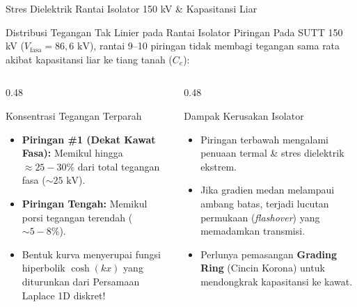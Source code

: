 \documentclass[aspectratio=169,10pt]{beamer}
\begin{document}
\begin{frame}{Stres Dielektrik Rantai Isolator 150 kV \& Kapasitansi Liar}
  \begin{block}{Distribusi Tegangan Tak Linier pada Rantai Isolator Piringan}
    \small
    Pada SUTT 150 kV ($V_{\text{fasa}} = 86{,}6\text{ kV}$), rantai 9--10 piringan tidak membagi tegangan sama rata akibat kapasitansi liar ke tiang tanah ($C_e$):
  \end{block}
  \begin{columns}[t]
    \begin{column}{0.48\textwidth}
      \begin{alertblock}{Konsentrasi Tegangan Terparah}
        \small
        \begin{itemize}
          \item \textbf{Piringan \#1 (Dekat Kawat Fasa):} Memikul hingga $\approx 25 - 30\%$ dari total tegangan fasa ($\sim 25\text{ kV}$).
          \item \textbf{Piringan Tengah:} Memikul porsi tegangan terendah ($\sim 5 - 8\%$).
          \item Bentuk kurva menyerupai fungsi hiperbolik $\cosh(k x)$ yang diturunkan dari Persamaan Laplace 1D diskret!
        \end{itemize}
      \end{alertblock}
    \end{column}
    \begin{column}{0.48\textwidth}
      \begin{exampleblock}{Dampak Kerusakan Isolator}
        \small
        \begin{itemize}
          \item Piringan terbawah mengalami penuaan termal \& stres dielektrik ekstrem.
          \item Jika gradien medan melampaui ambang batas, terjadi lucutan permukaan (\textit{flashover}) yang memadamkan transmisi.
          \item Perlunya pemasangan \textbf{Grading Ring} (Cincin Korona) untuk mendongkrak kapasitansi ke kawat.
        \end{itemize}
      \end{exampleblock}
    \end{column}
  \end{columns}
\end{frame}
\end{document}
